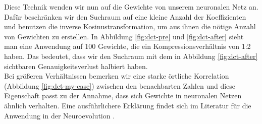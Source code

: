             Diese Technik wenden wir nun auf die Gewichte von unserem neuronalen Netz an. Dafür beschränken wir den Suchraum auf eine kleine Anzahl der Koeffizienten und benutzen die inverse Kosinustransformation, um aus ihnen die nötige Anzahl von Gewichten zu erstellen. In Abbildung \ref{fig:dct-pre} und \ref{fig:dct-after} sieht man eine Anwendung auf 100 Gewichte, die ein Kompressionsverhältnis von 1:2 haben. Das bedeutet, dass wir den Suchraum mit dem in Abbildung \ref{fig:dct-after} sichtbaren Genauigkeitsverlust halbiert haben.\\

            \noindent
            Bei größeren Verhältnissen bemerken wir eine starke örtliche Korrelation (Abbildung \ref{fig:dct-my-case}) zwischen den benachbarten Zahlen und diese Eigenschaft passt zu der Annahme, dass sich Gewichte in neuronalen Netzen ähnlich verhalten. Eine ausführlichere Erklärung findet sich im Literatur für die Anwendung in der Neuroevolution \cite{cosyne1}. \\[3mm]
